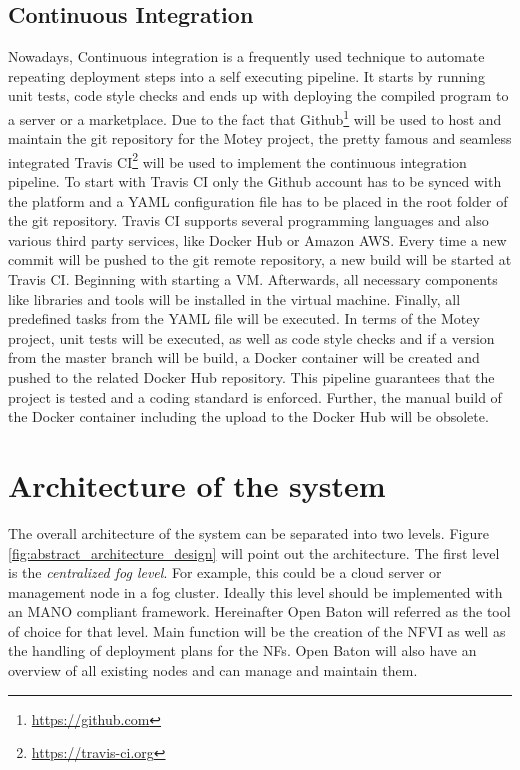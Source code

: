 \subsection{Continuous Integration}
Nowadays, Continuous integration is a frequently used technique to automate repeating deployment steps into a self executing pipeline.
It starts by running unit tests, code style checks and ends up with deploying the compiled program to a server or a marketplace.
Due to the fact that Github\footnote{\url{https://github.com}} will be used to host and maintain the git repository for the Motey project, the pretty famous and seamless integrated Travis CI\footnote{\url{https://travis-ci.org}} will be used to implement the continuous integration pipeline.
To start with Travis CI only the Github account has to be synced with the platform and a \ac{YAML} configuration file has to be placed in the root folder of the git repository.
Travis CI supports several programming languages and also various third party services, like Docker Hub or Amazon AWS.
Every time a new commit will be pushed to the git remote repository, a new build will be started at Travis CI.
Beginning with starting a \ac{VM}.
Afterwards, all necessary components like libraries and tools will be installed in the virtual machine.
Finally, all predefined tasks from the \ac{YAML} file will be executed.
In terms of the Motey project, unit tests will be executed, as well as code style checks and if a version from the master branch will be build, a Docker container will be created and pushed to the related Docker Hub repository.
This pipeline guarantees that the project is tested and a coding standard is enforced.
Further, the manual build of the Docker container including the upload to the Docker Hub will be obsolete.


\section{Architecture of the system}
The overall architecture of the system can be separated into two levels.
Figure \ref{fig:abstract_architecture_design} will point out the architecture.
The first level is the \textit{centralized fog level}.
For example, this could be a cloud server or management node in a fog cluster.
Ideally this level should be implemented with an \ac{MANO} compliant framework.
Hereinafter Open Baton will referred as the tool of choice for that level.
Main function will be the creation of the \ac{NFVI} as well as the handling of deployment plans for the \acp{NF}.
Open Baton will also have an overview of all existing nodes and can manage and maintain them.

